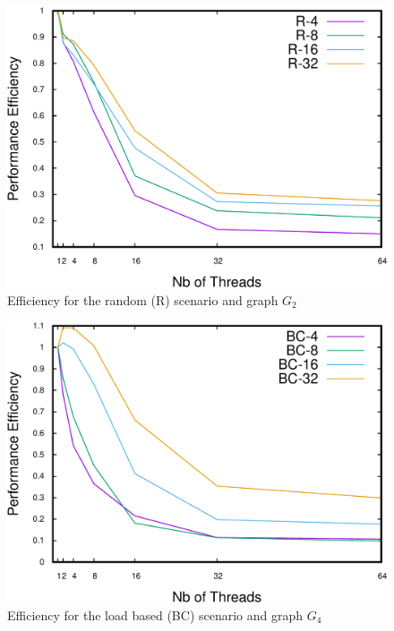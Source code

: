 \begin{figure}
\centering
\includegraphics[scale=0.35]{bench/generated/efficiency-r-2-crop.pdf}
\caption{Efficiency for the random (R) scenario and graph $G_2$}
\label{fig:effr2}
\end{figure}

\begin{figure}
\centering
\includegraphics[scale=0.35]{bench/generated/efficiency-bc-4-crop.pdf}
\caption{Efficiency for the load based (BC) scenario and graph $G_4$}
\label{fig:effbc4}
\end{figure}

